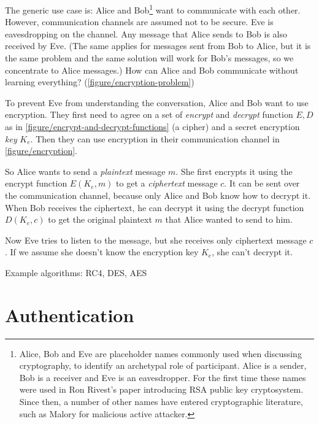 The generic use case is: Alice and Bob\footnote{Alice, Bob and Eve are placeholder names commonly used when discussing cryptography, to identify an archetypal role of participant. Alice is a sender, Bob is a receiver and Eve is an eavesdropper. For the first time these names were used in Ron Rivest's paper introducing RSA public key cryptosystem. \cite{rsa} Since then, a number of other names have entered cryptographic literature, such as Malory for malicious active attacker.} want to communicate with each other. However, communication channels are assumed not to be secure. Eve is eavesdropping on the channel. Any message that Alice sends to Bob is also received by Eve. (The same applies for messages sent from Bob to Alice, but it is the same problem and the same solution will work for Bob's messages, so we concentrate to Alice messages.) How can Alice and Bob communicate without learning everything? (\autoref{figure/encryption-problem}) \cite[p.~23]{ferguson2010cryptography}

To prevent Eve from understanding the conversation, Alice and Bob want to use encryption. They first need to agree on a set of \textit{encrypt} and \textit{decrypt} function $E, D$ as in \autoref{figure/encrypt-and-decrypt-functions} (a cipher) and a secret encryption \textit{key} $K_e$. Then they can use encryption in their communication channel in \autoref{figure/encryption}.

So Alice wants to send a \textit{plaintext} message $m$. She first encrypts it using the encrypt function $E(K_e, m)$ to get a \textit{ciphertext} message $c$. It can be sent over the communication channel, because only Alice and Bob know how to decrypt it. When Bob receives the ciphertext, he can decrypt it using the decrypt function $D(K_e, c)$ to get the original plaintext $m$ that Alice wanted to send to him.

Now Eve tries to listen to the message, but she receives only ciphertext message $c$. If we assume she doesn't know the encryption key $K_e$, she can't decrypt it.

Example algorithms: RC4, DES, AES





\section{Authentication}
\label{toc/authentication}

